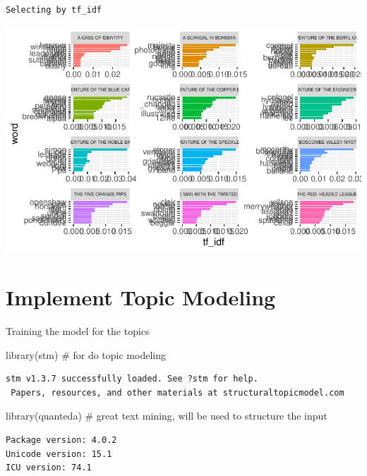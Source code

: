 \documentclass[
  letterpaper,
  DIV=11,
  numbers=noendperiod]{scrreprt}
\newenvironment{Shaded}{\begin{snugshade}}{\end{snugshade}}
\newcommand{\CommentTok}[1]{\textcolor[rgb]{0.37,0.37,0.37}{#1}}
\newcommand{\FunctionTok}[1]{\textcolor[rgb]{0.28,0.35,0.67}{#1}}
\newcommand{\NormalTok}[1]{\textcolor[rgb]{0.00,0.23,0.31}{#1}}
\begin{document}
\begin{verbatim}
Selecting by tf_idf
\end{verbatim}

\includegraphics{src/practice/topic-modeling-r_files/figure-pdf/unnamed-chunk-4-1.pdf}

\section{Implement Topic Modeling}\label{implement-topic-modeling}

Training the model for the topics

\begin{Shaded}
\begin{Highlighting}[]
\FunctionTok{library}\NormalTok{(stm)        }\CommentTok{\# for do topic modeling}
\end{Highlighting}
\end{Shaded}

\begin{verbatim}
stm v1.3.7 successfully loaded. See ?stm for help. 
 Papers, resources, and other materials at structuraltopicmodel.com
\end{verbatim}

\begin{Shaded}
\begin{Highlighting}[]
\FunctionTok{library}\NormalTok{(quanteda)   }\CommentTok{\# great text mining, will be used to structure the input}
\end{Highlighting}
\end{Shaded}

\begin{verbatim}
Package version: 4.0.2
Unicode version: 15.1
ICU version: 74.1
\end{verbatim}
\end{document}

